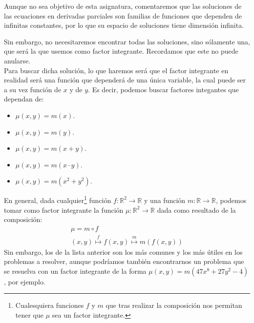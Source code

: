 Aunque no sea objetivo de esta asignatura, comentaremos que las soluciones de las ecuaciones en derivadas parciales son familias de funciones que dependen de infinitas constantes, por lo que su espacio de soluciones tiene dimensión infinita.

Sin embargo, no necesitaremos encontrar todas las soluciones, sino sólamente una, que será la que usemos como factor integrante. Recordamos que este no puede anularse.\\

Para buscar dicha solución, lo que haremos será que el factor integrante en realidad será una función que dependerá de una única variable, la cual puede ser a su vez función de $x$ y de $y$. Es decir, podemos buscar factores integantes que dependan de:
\begin{itemize}
    \item {} $\mu(x,y) = m(x)$.
    \item {} $\mu(x,y) = m(y)$.
    \item {} $\mu(x,y) = m(x+y)$.
    \item {} $\mu(x,y) = m(x\cdot y)$.
    \item {} $\mu(x,y) = m(x^2+y^2)$.
\end{itemize}
En general, dada cualquier\footnote{Cualesquiera funciones $f$ y $m$ que tras realizar la composición nos permitan tener que $\mu$ sea un factor integrante.} función $f:\mathbb{R}^2\rightarrow\mathbb{R}$ y una función $m:\mathbb{R}\rightarrow\mathbb{R}$, podemos tomar como factor integrante la función $\mu:\mathbb{R}^2\rightarrow\mathbb{R}$ dada como resultado de la composición:
\begin{gather*}
    \mu = m \circ f  \\
    (x,y) \stackrel{f}{\longmapsto} f(x,y) \stackrel{m}{\longmapsto} m(f(x,y))
\end{gather*}
Sin embargo, los de la lista anterior son los más comunes y los más útiles en los problemas a resolver, aunque podríamos también encontrarnos un problema que se resuelva con un factor integrante de la forma $\mu(x,y) = m(47x^8 + 27y^2 - 4)$, por ejemplo.\\

